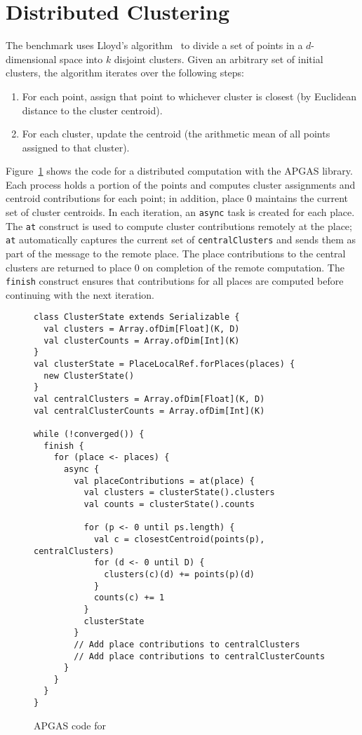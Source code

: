 \section{Distributed \kmeans Clustering}
\label{sec:kmeans}

The \kmeans benchmark uses Lloyd's algorithm~\cite{Lloyd1982Least} to divide a set of points in a $d$-dimensional space into $k$ disjoint clusters.
Given an arbitrary set of initial clusters, the algorithm iterates over the following steps:
\begin{enumerate}
  \item For each point, assign that point to whichever cluster is closest (by Euclidean distance to the cluster centroid).
  \item For each cluster, update the centroid (the arithmetic mean of all points assigned to that cluster).
\end{enumerate}
 
Figure~\ref{fig:kmeansCode} shows the code for a distributed \kmeans computation with the APGAS library.
Each process holds a portion of the points and computes cluster assignments and centroid contributions for each point; in addition, place 0 maintains the current set of cluster centroids.
In each iteration, an \lstinline{async} task is created for each place.
The \lstinline{at} construct is used to compute cluster contributions remotely at the place; \lstinline{at} automatically captures the current set of \lstinline{centralClusters} and sends them as part of the message to the remote place.
The place contributions to the central clusters are returned to place 0 on completion of the remote computation.
The \lstinline{finish} construct ensures that contributions for all places are computed before continuing with the next iteration.

\begin{figure}[tbp]
  \begin{lstlisting}
class ClusterState extends Serializable {
  val clusters = Array.ofDim[Float](K, D)
  val clusterCounts = Array.ofDim[Int](K)
}
val clusterState = PlaceLocalRef.forPlaces(places) {
  new ClusterState()
}
val centralClusters = Array.ofDim[Float](K, D)
val centralClusterCounts = Array.ofDim[Int](K)

while (!converged()) {
  finish {
    for (place <- places) {
      async {
        val placeContributions = at(place) {
          val clusters = clusterState().clusters
          val counts = clusterState().counts

          for (p <- 0 until ps.length) {
            val c = closestCentroid(points(p), centralClusters)
            for (d <- 0 until D) {
              clusters(c)(d) += points(p)(d)
            }
            counts(c) += 1
          }
          clusterState
        }
        // Add place contributions to centralClusters
        // Add place contributions to centralClusterCounts
      }
    }
  }
}  

  \end{lstlisting}
  \caption{APGAS code for \kmeans}
  \label{fig:kmeansCode}
\end{figure}

